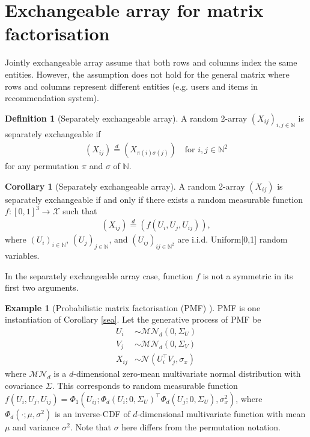 \documentclass{article}
\theoremstyle{definition}
\newtheorem{definition}{Definition}
\newtheorem{example}{Example}[definition]
\newtheorem{corollary}{Corollary}[definition] %
\begin{document}
\section{Exchangeable array for matrix factorisation}
Jointly exchangeable array assume that both rows and columns index the same entities. However, the assumption does not hold for the general matrix where rows and columns represent different entities (e.g. users and items in recommendation system).

\begin{definition}[Separately exchangeable array]A random 2-array $(X_{ij})_{i,j\in \mathbb{N}}$ is separately exchangeable if
\begin{align}
(X_{ij}) \stackrel{d}{=} (X_{\pi(i)\sigma(j)}) \quad \text{for } i,j \in \mathbb{N}^2
\end{align}
for any permutation $\pi$ and $\sigma$ of $\mathbb{N}$.
\end{definition}

\begin{corollary}[\label{sea}Separately exchangeable array] A random 2-array $(X_{ij})$ is separately exchangeable if and only if there exists a random measurable function $f:[0,1]^3 \rightarrow \mathcal{X}$ such that
\begin{align}
(X_{ij})  \stackrel{d}{=} (f(U_i, U_j, U_{ij})),
\end{align}
where $(U_i)_{i\in \mathbb{N}}$, $(U_j)_{j\in \mathbb{N}}$, and $(U_{ij})_{ij\in \mathbb{N}^2}$ are i.i.d. Uniform[0,1] random variables.
\end{corollary}
In the separately exchangeable array case, function $f$ is not a symmetric in its first two arguments.

\begin{example}[Probabilistic matrix factorisation (PMF) \citep{Salakhutdinov2008}] 
PMF is one instantiation of Corollary \ref{sea}. Let the generative process of PMF be
\begin{align}
U_i &\sim \mathcal{MN}_d(0, \Sigma_U)\\
V_j &\sim \mathcal{MN}_d(0, \Sigma_V)\\
X_{ij} &\sim \mathcal{N}(U_i^\top V_j, \sigma_x)
\end{align}
where $\mathcal{MN}_d$ is a $d$-dimensional zero-mean multivariate normal distribution with covariance $\Sigma$. This corresponds to random measurable function
$f(U_i, U_j, U_{ij}) = \Phi_1(U_{ij}; \Phi_d(U_i;0, \Sigma_{U})^\top \Phi_d(U_j;0, \Sigma_{U}), \sigma^2_x)$, where $\Phi_d(\cdot;\mu, \sigma^2)$ is an inverse-CDF of $d$-dimensional multivariate function with mean $\mu$ and variance $\sigma^2$. Note that $\sigma$ here differs from the permutation notation.
\end{example}
\end{document}
